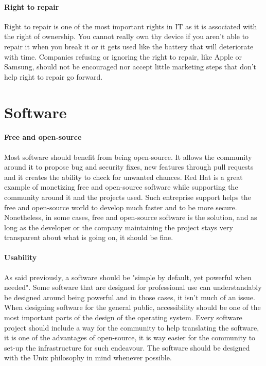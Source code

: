 \documentclass[a4paper,10pt]{article}
\begin{document}
\paragraph{Right to repair}

Right to repair is one of the most important rights in IT as it is associated with the right of ownership. You cannot really own thy device if you aren't able to repair it when you break it or it gets used like the battery that will deteriorate with time. Companies refusing or ignoring the right to repair, like Apple or Samsung, should not be encouraged nor accept little marketing steps that don't help right to repair go forward.

\pagebreak

\section{Software}

\paragraph{Free and open-source}

Most software should benefit from being open-source. It allows the community around it to propose bug and security fixes, new features through pull requests and it creates the ability to check for unwanted chances. Red Hat is a great example of monetizing free and open-source software while supporting the community around it and the projects used. Such entreprise support helps the free and open-source world to develop much faster and to be more secure. Nonetheless, in some cases, free and open-source software is the solution, and as long as the developer or the company maintaining the project stays very transparent about what is going on, it should be fine.

\paragraph{Usability}

As said previously, a software should be "simple by default, yet powerful when needed". Some software that are designed for professional use can understandably be designed around being powerful and in those cases, it isn't much of an issue. When designing software for the general public, accessibility should be one of the most important parts of the design of the operating system. Every software project should include a way for the community to help translating the software, it is one of the advantages of open-source, it is way easier for the community to set-up the infrastructure for such endeavour. The software should be designed with the Unix philosophy in mind whenever possible.
\end{document}
